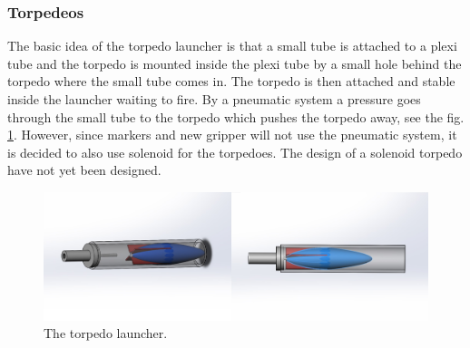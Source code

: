 \subsubsection{Torpedeos}
\label{torpedosection}
The basic idea of the torpedo launcher is that a small tube is attached to a plexi tube and the torpedo is mounted inside the plexi tube by a small hole behind the torpedo where the small tube comes in. The torpedo is then attached and stable inside the launcher waiting to fire. By a pneumatic system a pressure goes through the small tube to the torpedo which pushes the torpedo away, see the fig. \ref{torplunch}. However, since markers and new gripper will not use the pneumatic system, it is decided to also use solenoid for the torpedoes. The design of a solenoid torpedo have not yet been designed.


	\begin{figure}[!ht]
		\begin{center}
			\includegraphics[width=150mm]{./images/mechanics/OverallAssem2.JPG}
			\caption{The torpedo launcher.}
			\label{torplunch}
		\end{center}
	\end{figure}

